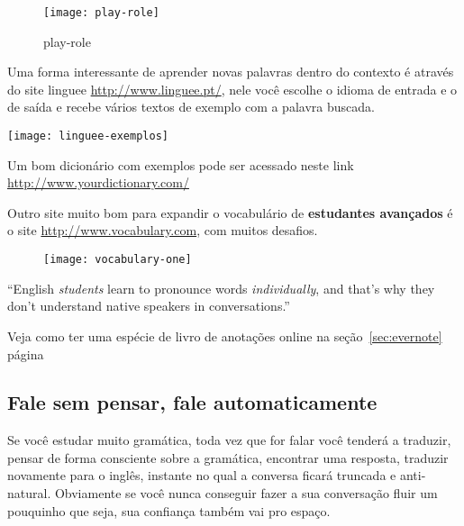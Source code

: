 \begin{figure}[h!]
	\centering
	\texttt{[image: play-role]}
	\caption{play-role}
\end{figure}

 Uma forma interessante de aprender
novas palavras dentro do contexto é através do site linguee
\href{http://www.linguee.pt/}{http://www.linguee.pt/}, nele você escolhe
o idioma de entrada e o de saída e recebe vários textos de exemplo com
a palavra buscada.

\texttt{[image: linguee-exemplos]}

\noindent
{\footnotesize {} Um bom dicionário com exemplos pode ser acessado neste link \href{http://www.yourdictionary.com/}{http://www.yourdictionary.com/} }

\noindent
Outro site muito bom para expandir o vocabulário de {\bf estudantes avançados} é o site
\href{http://www.vocabulary.com}{http://www.vocabulary.com}, com muitos desafios.

\begin{figure}[h!]
	\centering
	\texttt{[image: vocabulary-one]}
\end{figure}


\noindent
\vspace{0.3\baselineskip}
{\footnotesize {}  ``English {\em students} learn to pronounce words {\em individually},
and that's why they don't understand native speakers in conversations.''}

\vspace{0.3\baselineskip}
\noindent
{\footnotesize {} Veja como ter uma espécie de livro de anotações online
na seção~\ref{sec:evernote} página~\pageref{sec:evernote}}


\subsection{Fale sem pensar, fale automaticamente}

Se você estudar muito gramática, toda vez que for falar você tenderá
a traduzir, pensar de forma consciente sobre a gramática, encontrar uma
resposta, traduzir novamente para o inglês, instante no qual a conversa ficará
truncada e anti-natural. Obviamente se você nunca conseguir fazer a sua
conversação fluir um pouquinho que seja, sua confiança também vai pro espaço.

